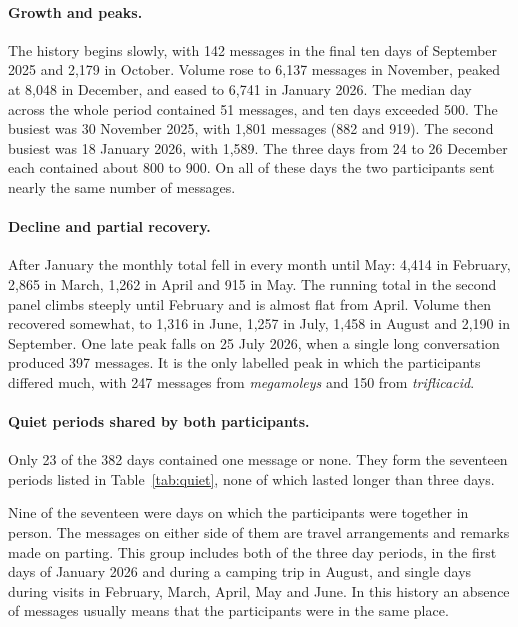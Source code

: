 \documentclass[11pt,a4paper]{article}
\newcommand{\userA}{\textit{triflicacid}}
\newcommand{\userB}{\textit{megamoleys}}
\begin{document}
\paragraph{Growth and peaks.}
The history begins slowly, with 142 messages in the final ten days of September 2025
and 2,179 in October. Volume rose to 6,137 messages in November, peaked at 8,048 in
December, and eased to 6,741 in January 2026. The median day across the whole period
contained 51 messages, and ten days exceeded 500. The busiest was 30 November 2025,
with 1,801 messages (882 and 919). The second busiest was 18 January 2026, with
1,589. The three days from 24 to 26 December each contained about 800 to 900. On all
of these days the two participants sent nearly the same number of messages.

\paragraph{Decline and partial recovery.}
After January the monthly total fell in every month until May: 4,414 in February,
2,865 in March, 1,262 in April and 915 in May. The running total in the second panel
climbs steeply until February and is almost flat from April. Volume then recovered
somewhat, to 1,316 in June, 1,257 in July, 1,458 in August and 2,190 in September.
One late peak falls on 25 July 2026, when a single long conversation produced 397
messages. It is the only labelled peak in which the participants differed much, with
247 messages from \userB{} and 150 from \userA{}.

\paragraph{Quiet periods shared by both participants.}
Only 23 of the 382 days contained one message or none. They form the seventeen
periods listed in Table~\ref{tab:quiet}, none of which lasted longer than three days.

Nine of the seventeen were days on which the participants were together in person.
The messages on either side of them are travel arrangements and remarks made on
parting. This group includes both of the three day periods, in the first days of
January 2026 and during a camping trip in August, and single days during visits in
February, March, April, May and June. In this history an absence of messages usually
means that the participants were in the same place.
\end{document}
